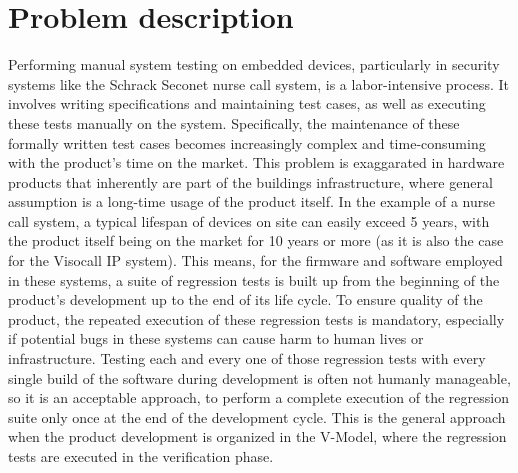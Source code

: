 \documentclass[Proposal,BIC,english,IEEE]{BASE/twbook} %
\begin{document}
\chapter{Problem description}
Performing manual system testing on embedded devices, particularly in security systems like the Schrack Seconet nurse call system, is a labor-intensive process. It involves writing specifications and maintaining test cases, as well as executing these tests manually on the system. Specifically, the maintenance of these formally written test cases becomes increasingly complex and time-consuming with the product's time on the market. This problem is exaggarated in hardware products that inherently are part of the buildings infrastructure, where general assumption is a long-time usage of the product itself. In the example of a nurse call system, a typical lifespan of devices on site can easily exceed 5 years, with the product itself being on the market for 10 years or more (as it is also the case for the Visocall IP system).
This means, for the firmware and software employed in these systems, a suite of regression tests is built up from the beginning of the product's development up to the end of its life cycle. To ensure quality of the product, the repeated execution of these regression tests is mandatory, especially if potential bugs in these systems can cause harm to human lives or infrastructure.
Testing each and every one of those regression tests with every single build of the software during development is often not humanly manageable, so it is an acceptable approach, to perform a complete execution of the regression suite only once at the end of the development cycle. This is the general approach when the product development is organized in the V-Model, where the regression tests are executed in the verification phase.
\end{document}
